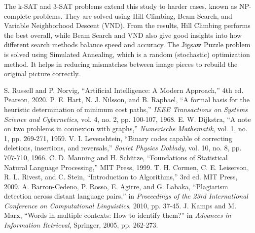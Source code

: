 \documentclass[conference]{IEEEtran}
\begin{document}
The k-SAT and 3-SAT problems extend this study to harder cases, known as NP-complete problems. They are solved using Hill Climbing, Beam Search, and Variable Neighborhood Descent (VND). From the results, Hill Climbing performs the best overall, while Beam Search and VND also give good insights into how different search methods balance speed and accuracy. The Jigsaw Puzzle problem is solved using Simulated Annealing, which is a random (stochastic) optimization method. It helps in reducing mismatches between image pieces to rebuild the original picture correctly.

\begin{thebibliography}{00}
 S. Russell and P. Norvig, ``Artificial Intelligence: A Modern Approach,'' 4th ed. Pearson, 2020.
 P. E. Hart, N. J. Nilsson, and B. Raphael, ``A formal basis for the heuristic determination of minimum cost paths,'' \emph{IEEE Transactions on Systems Science and Cybernetics}, vol. 4, no. 2, pp. 100-107, 1968.
 E. W. Dijkstra, ``A note on two problems in connexion with graphs,'' \emph{Numerische Mathematik}, vol. 1, no. 1, pp. 269-271, 1959.
 V. I. Levenshtein, ``Binary codes capable of correcting deletions, insertions, and reversals,'' \emph{Soviet Physics Doklady}, vol. 10, no. 8, pp. 707-710, 1966.
 C. D. Manning and H. Schütze, ``Foundations of Statistical Natural Language Processing,'' MIT Press, 1999.
 T. H. Cormen, C. E. Leiserson, R. L. Rivest, and C. Stein, ``Introduction to Algorithms,'' 3rd ed. MIT Press, 2009.
 A. Barron-Cedeno, P. Rosso, E. Agirre, and G. Labaka, ``Plagiarism detection across distant language pairs,'' in \emph{Proceedings of the 23rd International Conference on Computational Linguistics}, 2010, pp. 37-45.
 J. Kamps and M. Marx, ``Words in multiple contexts: How to identify them?'' in \emph{Advances in Information Retrieval}, Springer, 2005, pp. 262-273.
\end{thebibliography}
\end{document}
